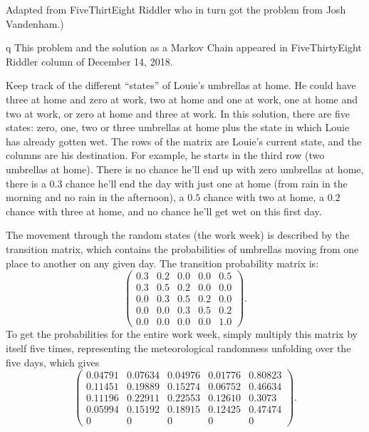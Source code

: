 \documentclass[12pt]{article}
\begin{document}
\begin{solution}
    Adapted from 
    {FiveThirtEight Riddler} who in turn got the problem from Josh
    Vandenham.)
    \begin{remark}
        q This problem and the solution as a Markov Chain appeared in
        {FiveThirtyEight Riddler column of December 14, 2018.}
    \end{remark}

    Keep track of the different ``states'' of Louie’s umbrellas at home.
    He could have three at home and zero at work, two at home and one at
    work, one at home and two at work, or zero at home and three at
    work.  In this solution, there are five states:  zero, one, two or three
    umbrellas at home plus the state in which Louie has already gotten
    wet.  The rows of the matrix are Louie’s current state, and the
    columns are his destination.  For example, he starts in the third
    row (two umbrellas at home).  There is no chance he’ll end up with
    zero umbrellas at home, there is a \( 0.3 \) chance he’ll end the day
    with just one at home (from rain in the morning and no rain in the
    afternoon), a \( 0.5 \) chance with two at home, a \(
    0.2 \) chance
    with three at home, and no chance he’ll get wet on this first day.

    The movement through the random states (the work week) is
    described by the transition matrix, which contains the probabilities
    of umbrellas moving from one place to another on any given day.  
    The transition probability matrix is:
    \[
        \begin{pmatrix}
            0.3 & 0.2 & 0.0 & 0.0 & 0.5\\
            0.3 & 0.5 & 0.2 & 0.0 & 0.0\\
            0.0 & 0.3 & 0.5 & 0.2 & 0.0\\
            0.0 & 0.0 & 0.3 & 0.5 & 0.2\\
            0.0 & 0.0 & 0.0 & 0.0 & 1.0
        \end{pmatrix}
        .
    \] 
    To get the probabilities for the entire work week, simply multiply
    this matrix by itself five times, representing the meteorological
    randomness unfolding over the five days, which gives
    \[
        \begin{pmatrix}
            \nonumber 0.04791 &0.07634 &0.04976 &0.01776 &0.80823\\
            0.11451 &0.19889 &0.15274 &0.06752 &0.46634\\
            0.11196 &0.22911 &0.22553 &0.12610 &0.3073\\
            0.05994 &0.15192 &0.18915 &0.12425 &0.47474\\
            0 &0 &0 &0 &0
        \end{pmatrix}
        .
    \]


\end{solution}
\end{document}
